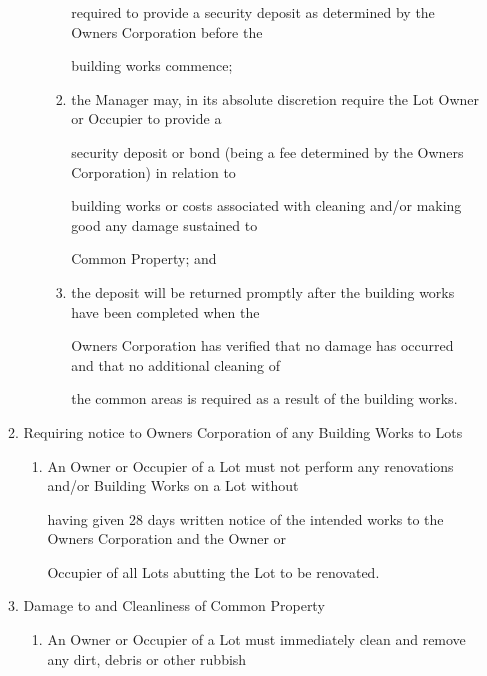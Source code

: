 \documentclass{article}
\begin{document}
\begin{enumerate}[label=\arabic*.]
\begin{enumerate}[label=\arabic{enumi}.\arabic*.]
\begin{enumerate}[label=(\arabic*)]
\begin{enumerate}[label=(\alph*)]
{\fontsize{10.02}{1}required to provide a security deposit as determined by the Owners Corporation before the }

{\fontsize{10.02}{1}building works commence; }

\item {\fontsize{9.962}{1} the Manager may, in its absolute discretion require the Lot Owner or Occupier to provide a }

{\fontsize{10.02}{1}security deposit or bond (being a fee determined by the Owners Corporation) in relation to }

{\fontsize{10.02}{1}building works or costs associated with cleaning and/or making good any damage sustained to }

{\fontsize{10.02}{1}Common Property; and }

\item {\fontsize{9.962}{1} the deposit will be returned promptly after the building works have been completed when the }

{\fontsize{10.02}{1}Owners Corporation has verified that no damage has occurred and that no additional cleaning of }

{\fontsize{10.02}{1}the common areas is required as a result of the building works. }

\end{enumerate}
\end{enumerate}
\item {\fontsize{9.99}{1} Requiring notice to Owners Corporation of any Building Works to Lots }

\begin{enumerate}[label=(\arabic*)]
\item {\fontsize{9.962}{1} An Owner or Occupier of a Lot must not perform any renovations and/or Building Works on a Lot without }

{\fontsize{10.02}{1}having given 28 days written notice of the intended works to the Owners Corporation and the Owner or }

{\fontsize{10.02}{1}Occupier of all Lots abutting the Lot to be renovated. }

\end{enumerate}
\item {\fontsize{9.99}{1} Damage to and Cleanliness of Common Property }

\begin{enumerate}[label=(\arabic*)]
\item {\fontsize{9.962}{1} An Owner or Occupier of a Lot must immediately clean and remove any dirt, debris or other rubbish }


\end{enumerate}
\end{enumerate}
\end{enumerate}
\end{document}

